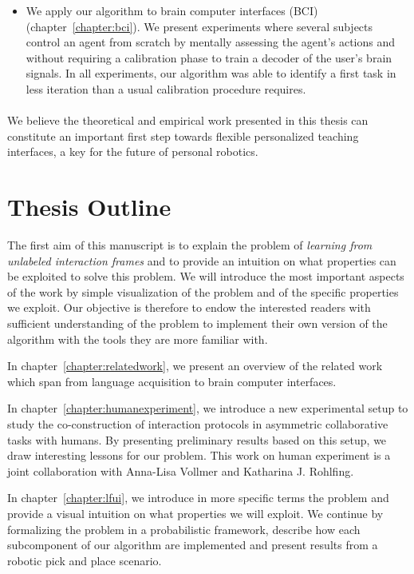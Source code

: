 \begin{itemize}
\item We apply our algorithm to brain computer interfaces (BCI) \cite{grizou2013zero,grizou2014calibration} (chapter~\ref{chapter:bci}). We present experiments where several subjects control an agent from scratch by mentally assessing the agent's actions and without requiring a calibration phase to train a decoder of the user's brain signals. In all experiments, our algorithm was able to identify a first task in less iteration than a usual calibration procedure requires.

\end{itemize}

\paragraph{} We believe the theoretical and empirical work presented in this thesis can constitute an important first step towards flexible personalized teaching interfaces, a key for the future of personal robotics.

\section{Thesis Outline}

The first aim of this manuscript is to explain the problem of \emph{learning from unlabeled interaction frames} and to provide an intuition on what properties can be exploited to solve this problem. We will introduce the most important aspects of the work by simple visualization of the problem and of the specific properties we exploit. Our objective is therefore to endow the interested readers with sufficient understanding of the problem to implement their own version of the algorithm with the tools they are more familiar with.

In chapter~\ref{chapter:relatedwork}, we present an overview of the related work which span from language acquisition to brain computer interfaces.

In chapter~\ref{chapter:humanexperiment}, we introduce a new experimental setup to study the co-construction of interaction protocols in asymmetric collaborative tasks with humans. By presenting preliminary results based on this setup, we draw interesting lessons for our problem. This work on human experiment is a joint collaboration with Anna-Lisa Vollmer and Katharina J. Rohlfing.

In chapter~\ref{chapter:lfui}, we introduce in more specific terms the problem and provide a visual intuition on what properties we will exploit. We continue by formalizing the problem in a probabilistic framework, describe how each subcomponent of our algorithm are implemented and present results from a robotic pick and place scenario.


